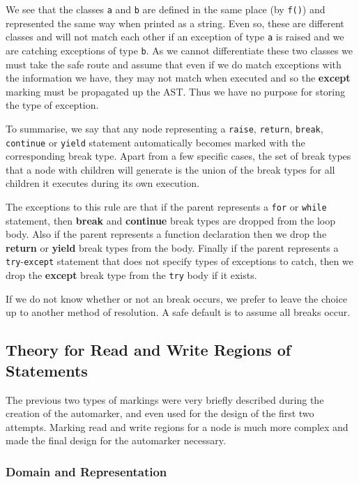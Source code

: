 \documentclass{report}
\begin{document}


We see that the classes \texttt{a} and \texttt{b} are defined in the same place (by \texttt{f()}) and represented the same way when printed as a string. Even
so, these are different classes and will not match each other if an exception of type \texttt{a} is raised and we are catching exceptions of type \texttt{b}.
As we cannot differentiate these two classes we must take the safe route and assume that even if we do match exceptions with the information we have, they may
not match when executed and so the \textbf{except} marking must be propagated up the AST. Thus we have no purpose for storing the type of exception.

To summarise, we say that any node representing a \texttt{raise}, \texttt{return}, \texttt{break}, \texttt{continue} or \texttt{yield} statement automatically
becomes marked with the corresponding break type. Apart from a few specific cases, the set of break types that a node with children will generate is the union
of the break types for all children it executes during its own execution.

The exceptions to this rule are that if the parent represents a \texttt{for} or \texttt{while} statement, then \textbf{break} and \textbf{continue} break types
are dropped from the loop body. Also if the parent represents a function declaration then we drop the \textbf{return} or \textbf{yield} break types from the
body. Finally if the parent represents a \texttt{try}-\texttt{except} statement that does not specify types of exceptions to catch, then we drop the
\textbf{except} break type from the \texttt{try} body if it exists.

If we do not know whether or not an break occurs, we prefer to leave the choice up to another method of resolution. A safe default is to assume all breaks occur.

\subsection{Theory for Read and Write Regions of Statements}

The previous two types of markings were very briefly described during the creation of the automarker, and even used for the design of the first two attempts.
Marking read and write regions for a node is much more complex and made the final design for the automarker necessary.

\subsubsection{Domain and Representation}
\end{document}
